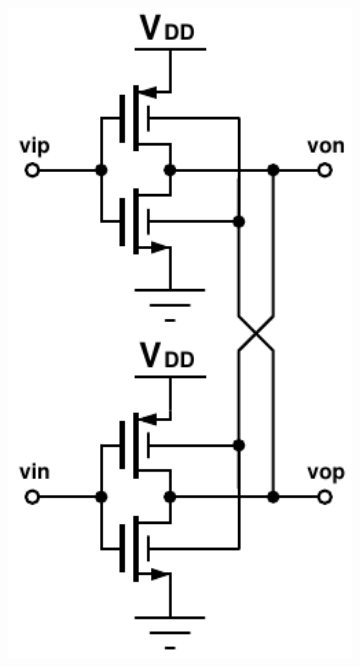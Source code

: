 			\begin{figure}[htb!]
			    \centering
			    \begin{subfigure}{0.25\textwidth}
			        \centering
			        \includegraphics[width=1\textwidth, angle=0]{./figs/design/pseudodiff_bw}
			        \caption{ }
			        \label{fig:pseudodiff_cir}
			    \end{subfigure}%

\end{figure}
